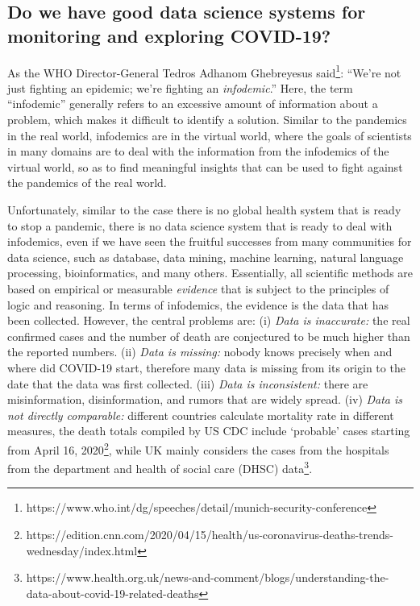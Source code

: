 \subsection{Do we have good data science systems for monitoring and exploring COVID-19?}

As the WHO Director-General Tedros Adhanom Ghebreyesus said\footnote{https://www.who.int/dg/speeches/detail/munich-security-conference}: ``We’re not just fighting an epidemic; we’re fighting an {\em infodemic}.'' Here, the term ``infodemic'' generally refers to an excessive amount of information about a problem, which makes it difficult to identify a solution. 
%
Similar to the pandemics in the real world, infodemics are in the virtual world, where the goals of scientists in many domains are to deal with the information from the infodemics of the virtual world, so as to find meaningful insights that can be used to fight against the pandemics of the real world.
%


Unfortunately, similar to the case there is no global health system that is ready to stop a pandemic, there is no data science system that is ready to deal with infodemics, even if we have seen the fruitful successes from many communities for data science, such as database, data mining, machine learning, natural language processing, bioinformatics, and many others.
%
Essentially, all scientific methods are based on empirical or measurable {\em evidence} that is subject to the principles of logic and reasoning.
%
In terms of infodemics, the evidence is the data that has been collected.
%
However, the central problems are:
%
(i) {\em Data is inaccurate:} the real confirmed cases and the number of death are conjectured to be much higher than the reported numbers.
%
(ii) {\em Data is missing:} nobody knows precisely when and where did COVID-19 start, therefore many data is missing from its origin to the date that the data was first collected.
%
(iii) {\em Data is inconsistent:} there are misinformation, disinformation, and rumors that are widely spread.
%
(iv) {\em Data is not directly comparable:} different countries calculate mortality rate in different measures, \eg the death totals compiled by US CDC include `probable' cases starting from April 16, 2020\footnote{https://edition.cnn.com/2020/04/15/health/us-coronavirus-deaths-trends-wednesday/index.html}, while UK mainly considers the cases from the hospitals from the department and health of social care (DHSC) data\footnote{https://www.health.org.uk/news-and-comment/blogs/understanding-the-data-about-covid-19-related-deaths}.


